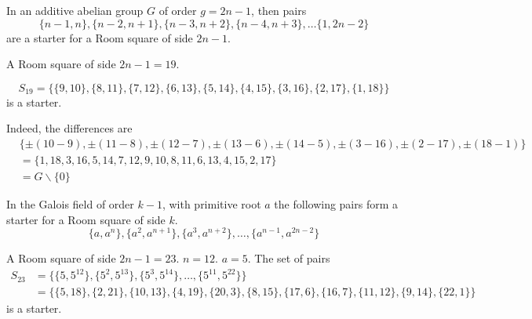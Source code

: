 \begin{lemma}
In an additive abelian group $G$ of order $g = 2n-1$, then pairs
\begin{equation*}
  \{n - 1, n\}, \{n - 2, n + 1\}, \{n - 3, n + 2\}, \{n - 4, n + 3\}, \ldots\{1, 2n - 2\}
\end{equation*}
are a starter for a Room square of side $2n - 1$.
\end{lemma}

\begin{example}
A Room square of side $2n - 1 = 19$.

\begin{equation*}
S_{19} = \{\{9, 10\}, \{8, 11\}, \{7, 12\}, \{6, 13\}, \{5, 14\}, \{4, 15\}, \{3, 16\}, \{2, 17\}, \{1, 18\}\}
\end{equation*}
is a starter.

Indeed, the differences are
\begin{equation*}
\begin{split}
  & \{\pm(10 - 9), \pm(11 - 8), \pm(12 - 7), \pm(13 - 6), \pm(14 - 5), \pm(3 - 16), \pm(2 - 17), \pm(18 - 1)\} \\ 
  &= \{1, 18, 3, 16, 5, 14, 7, 12, 9, 10, 8, 11, 6, 13, 4, 15, 2, 17\} \\
  &= G \backslash \{0\}
\end{split}
\end{equation*}
\end{example}

\begin{lemma}
In the Galois field of order $k - 1$, with primitive root $a$ the following pairs form a starter for a Room square of side $k$.
\begin{equation}
  \{a, a^n\}, \{a^2, a^{n + 1}\}, \{a^3, a^{n + 2}\}, \ldots, \{a^{n - 1}, a^{2n - 2}\}
\end{equation}
\end{lemma}

\begin{example}
A Room square of side $2n - 1 = 23$. $n = 12$. $a = 5$.
The set of pairs
\begin{equation*}
\begin{split}
S_{23} &= \{\{5, 5^{12}\}, \{5^2, 5^{13}\}, \{5^3, 5^{14}\}, \ldots, \{5^{11}, 5^{22}\}\} \\
       &= \{\{5, 18\}, \{2, 21\}, \{10, 13\}, \{4, 19\}, \{20, 3\}, \{8, 15\}, \{17, 6\}, \{16, 7\}, \{11, 12\}, \{9, 14\}, \{22, 1\}\}
\end{split}
\end{equation*}
is a starter.
\end{example}


